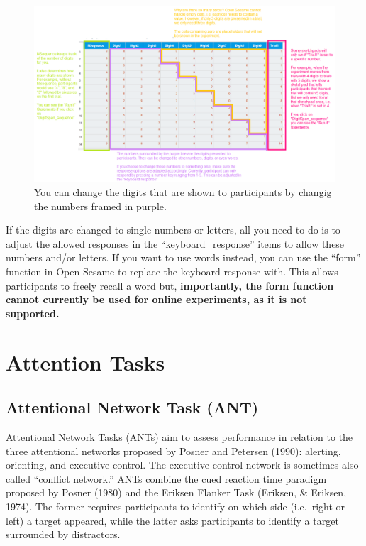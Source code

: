 \documentclass[
]{book}
\begin{document}
\begin{figure}

{\centering \includegraphics[width=0.99\linewidth]{images/ChangeDigitSpan} 

}

\caption{You can change the digits that are shown to participants by changig the numbers framed in purple.}\label{fig:Figure2-1}
\end{figure}

If the digits are changed to single numbers or letters, all you need to do is to adjust the allowed responses in the ``keyboard\_response'' items to allow these numbers and/or letters. If you want to use words instead, you can use the ``form'' function in Open Sesame to replace the keyboard response with. This allows participants to freely recall a word but, \textbf{importantly, the form function cannot currently be used for online experiments, as it is not supported.}

\hypertarget{attention-tasks}{%
\chapter{Attention Tasks}\label{attention-tasks}}

\hypertarget{attentional-network-task-ant}{%
\section{Attentional Network Task (ANT)}\label{attentional-network-task-ant}}

Attentional Network Tasks (ANTs) aim to assess performance in relation to the three attentional networks proposed by Posner and Petersen (1990): alerting, orienting, and executive control. The executive control network is sometimes also called ``conflict network.'' ANTs combine the cued reaction time paradigm proposed by Posner (1980) and the Eriksen Flanker Task (Eriksen, \& Eriksen, 1974). The former requires participants to identify on which side (i.e.~right or left) a target appeared, while the latter asks participants to identify a target surrounded by distractors.
\end{document}
